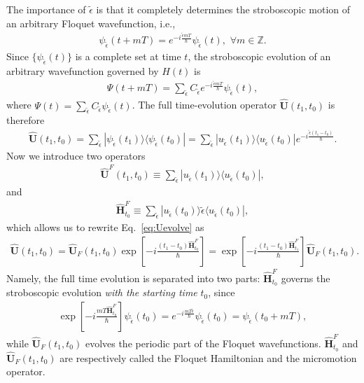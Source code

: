 \documentclass[aps,prb,showpacs,amsmath,amssymb,superscriptaddress]{revtex4-2}
\let\oldhat\hat
\renewcommand{\hat}[1]{\oldhat{\mathbf{#1}}}
\begin{document}
The importance of $\tilde{\epsilon}$ is that it completely determines the stroboscopic motion of an arbitrary Floquet wavefunction, i.e.,
\begin{eqnarray}
	\psi_{\tilde{\epsilon}} (t + m T) = e^{-i \frac{\tilde{\epsilon} m T}{\hbar}} \psi_{\tilde{\epsilon}} (t),\,\, \forall m\in \mathbb{Z}.
\end{eqnarray}
Since $\{\psi_{\tilde{\epsilon}}(t)\}$ is a complete set at time $t$, the stroboscopic evolution of an arbitrary wavefunction governed by $H(t)$ is
\begin{eqnarray}
	\Psi(t + m T) = \sum_{\tilde{\epsilon}} C_{\tilde{\epsilon}} e^{-i \frac{\tilde{\epsilon} m T}{\hbar}} \psi_{\tilde{\epsilon}} (t),
\end{eqnarray}
where $\Psi(t) =  \sum_{\tilde{\epsilon}} C_{\tilde{\epsilon}} \psi_{\tilde{\epsilon}} (t)$. The full time-evolution operator $\hat{U}(t_1,t_0)$ is therefore
\begin{eqnarray}\label{eq:Uevolve}
	\hat{U}(t_1,t_0) = \sum_{\tilde{\epsilon}}|\psi_{\tilde{\epsilon}} (t_1)\rangle \langle \psi_{\tilde{\epsilon}} (t_0) | = \sum_{\tilde{\epsilon}} |u_{\tilde{\epsilon}} (t_1)\rangle \langle u_{\tilde{\epsilon}} (t_0) | e^{-i\frac{\tilde{\epsilon}(t_1 - t_0)}{\hbar}}.
\end{eqnarray}
Now we introduce two operators
\begin{eqnarray}\label{eq:UFt1t0}
	\hat{U}^F(t_1,t_0) \equiv \sum_{\tilde{\epsilon}} |u_{\tilde{\epsilon}} (t_1)\rangle \langle u_{\tilde{\epsilon}} (t_0) |,
\end{eqnarray}
and
\begin{eqnarray}\label{eq:HFt0}
	\hat{H}^F_{t_0} \equiv \sum_{\tilde{\epsilon}} |u_{\tilde{\epsilon}} (t_0)\rangle\tilde{\epsilon} \langle u_{\tilde{\epsilon}} (t_0) |,
\end{eqnarray}
which allows us to rewrite Eq.~\ref{eq:Uevolve} as
\begin{eqnarray}
	\hat{U}(t_1,t_0) = \hat{U}_F(t_1,t_0) \exp\left[ -i\frac{(t_1 - t_0)\hat{H}^F_{t_0} }{\hbar}  \right] = \exp\left[ -i\frac{(t_1 - t_0)\hat{H}^F_{t_1} }{\hbar}  \right] \hat{U}_F(t_1,t_0).
\end{eqnarray}
Namely, the full time evolution is separated into two parts: $\hat{H}^F_{t_0}$ governs the stroboscopic evolution \emph{with the starting time} $t_0$, since
\begin{eqnarray}
	\exp\left[ -i\frac{m T \hat{H}^F_{t_0} }{\hbar}  \right] \psi_{\tilde{\epsilon}}(t_0) = e^{-i\frac{m T \tilde{\epsilon}}{\hbar} } \psi_{\tilde{\epsilon}}(t_0) = \psi_{\tilde{\epsilon}}(t_0 + m T),
\end{eqnarray}
while $\hat{U}_F (t_1, t_0)$ evolves the periodic part of the Floquet wavefunctions. $\hat{H}^F_{t_0} $ and $\hat{U}_F (t_1, t_0)$ are respectively called the Floquet Hamiltonian and the micromotion operator.
\end{document}
